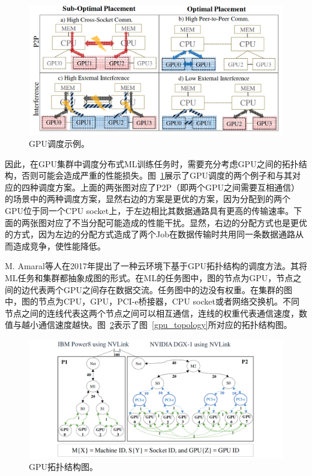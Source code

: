 \begin{figure}[h]
    \centerline{\includegraphics[width=\textwidth]{figures/gpu-top-sub-opt.png}}
    \caption{GPU调度示例。}
    \label{gpu_top_sub_opt}
\end{figure}

因此，在GPU集群中调度分布式ML训练任务时，需要充分考虑GPU之间的拓扑结构，否则可能会造成严重的性能损失。图~\ref{gpu_top_sub_opt}展示了GPU调度的两个例子和与其对应的四种调度方案。上面的两张图对应了P2P（即两个GPU之间需要互相通信）的场景中的两种调度方案，显然右边的方案是更优的方案，因为分配到的两个GPU位于同一个CPU socket上，于左边相比其数据通路具有更高的传输速率。下面的两张图对应了不当分配可能造成的性能干扰。显然，右边的分配方式也是更优的方式，因为左边的分配方式造成了两个Job在数据传输时共用同一条数据通路从而造成竞争，使性能降低。

M. Amaral等人\parencite{amaral2017topology}在2017年提出了一种云环境下基于GPU拓扑结构的调度方法。其将ML任务和集群都抽象成图的形式。在ML的任务图中，图的节点为GPU，节点之间的边代表两个GPU之间存在数据交流。任务图中的边没有权重。在集群的图中，图的节点为CPU，GPU，PCI-e桥接器，CPU socket或者网络交换机。不同节点之间的连线代表这两个节点之间可以相互通信，连线的权重代表通信速度，数值与越小通信速度越快。图~\ref{gpu_graph}表示了图~\ref{gpu_topology}所对应的拓扑结构图。

\begin{figure}[h]
    \centerline{\includegraphics[width=\textwidth]{figures/gpu-graph.png}}
    \caption{GPU拓扑结构图。}
    \label{gpu_graph}
\end{figure}

